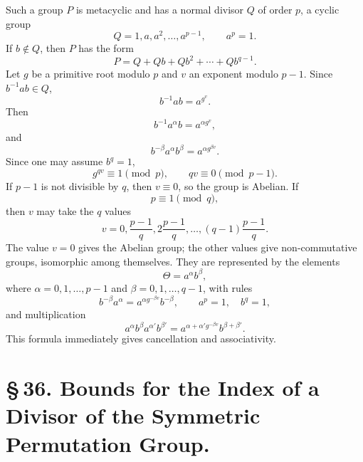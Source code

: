 \documentclass[11pt]{article}
\begin{document}
Such a group $P$ is metacyclic and has a normal divisor $Q$ of order $p$, a cyclic group
\begin{equation}
Q=1,a,a^2,\ldots,a^{p-1},\qquad a^p=1.
\tag{1}
\end{equation}
If $b\notin Q$, then $P$ has the form
\begin{equation}
P=Q+Qb+Qb^2+\cdots+Qb^{q-1}.
\tag{2}
\end{equation}
Let $g$ be a primitive root modulo $p$ and $v$ an exponent modulo $p-1$. Since $b^{-1}ab\in Q$,
\begin{equation}
b^{-1}ab=a^{g^v}.
\tag{3}
\end{equation}
Then
\begin{equation}
b^{-1}a^\alpha b=a^{\alpha g^v},
\tag{4}
\end{equation}
and
\begin{equation}
b^{-\beta}a^\alpha b^\beta=a^{\alpha g^{\beta v}}.
\tag{5}
\end{equation}
Since one may assume $b^q=1$,
\begin{equation}
g^{qv}\equiv1\pmod p,
\qquad qv\equiv0\pmod{p-1}.
\tag{6}
\end{equation}
If $p-1$ is not divisible by $q$, then $v\equiv0$, so the group is Abelian. If
\[
p\equiv1\pmod q,
\]
then $v$ may take the $q$ values
\begin{equation}
v=0,\frac{p-1}{q},2\frac{p-1}{q},\ldots,(q-1)\frac{p-1}{q}.
\tag{7}
\end{equation}
The value $v=0$ gives the Abelian group; the other values give non-commutative groups, isomorphic among themselves. They are represented by the elements
\begin{equation}
\Theta=a^\alpha b^\beta,
\tag{8}
\end{equation}
where $\alpha=0,1,\ldots,p-1$ and $\beta=0,1,\ldots,q-1$, with rules
\begin{equation}
b^{-\beta}a^\alpha=a^{\alpha g^{-\beta v}}b^{-\beta},\qquad a^p=1,
\quad b^q=1,
\tag{9}
\end{equation}
and multiplication
\begin{equation}
a^\alpha b^\beta a^{\alpha'}b^{\beta'}=a^{\alpha+\alpha'g^{-\beta v}}b^{\beta+\beta'}.
\tag{10}
\end{equation}
This formula immediately gives cancellation and associativity.

\section*{\S\,36. Bounds for the Index of a Divisor of the Symmetric Permutation Group.}
\end{document}
